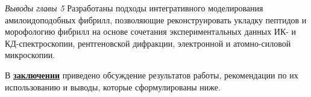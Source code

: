 \textit{Выводы главы 5} \newline
Разработаны подходы интегративного моделирования амилоидоподобных фибрилл, позволяющие реконструировать укладку пептидов и морофологию фибрилл на основе сочетания экспериментальных данных ИК- и КД-спектроскопии, рентгеновской дифракции, электронной и атомно-силовой микроскопии.




В \underline{\textbf{заключении}} приведено обсуждение результатов работы, рекомендации по их использованию и выводы, которые сформулированы ниже.

